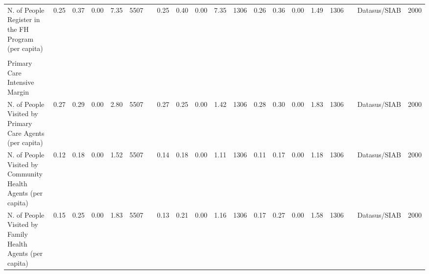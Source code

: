 \begin{sidewaystable}
\begin{table}[H]
\begin{footnotesize}
\begin{center}
{\begin{threeparttable}[b]
\begin{tabular}{rrrrrrrrrrrrrrrrrrrr}
    \multicolumn{1}{l}{N. of People Register in the FH Program (per capita)} & \multicolumn{1}{c}{0.25} & \multicolumn{1}{c}{0.37} & \multicolumn{1}{c}{0.00} & \multicolumn{1}{c}{7.35} & \multicolumn{1}{c}{5507} &       & \multicolumn{1}{c}{0.25} & \multicolumn{1}{c}{0.40} & \multicolumn{1}{c}{0.00} & \multicolumn{1}{c}{7.35} & \multicolumn{1}{c}{1306} & \multicolumn{1}{c}{0.26} & \multicolumn{1}{c}{0.36} & \multicolumn{1}{c}{0.00} & \multicolumn{1}{c}{1.49} & \multicolumn{1}{c}{1306} &       & \multicolumn{1}{c}{Datasus/SIAB} & \multicolumn{1}{c}{2000} \\
          &       &       &       &       &       &       &       &       &       &       &       &       &       &       &       &       &       &       &  \\
    \multicolumn{1}{l}{Primary Care Intensive Margin} &       &       &       &       &       &       &       &       &       &       &       &       &       &       &       &       &       &       &  \\
    \multicolumn{1}{l}{N. of People Visited by Primary Care Agents (per capita)} & \multicolumn{1}{c}{0.27} & \multicolumn{1}{c}{0.29} & \multicolumn{1}{c}{0.00} & \multicolumn{1}{c}{2.80} & \multicolumn{1}{c}{5507} &       & \multicolumn{1}{c}{0.27} & \multicolumn{1}{c}{0.25} & \multicolumn{1}{c}{0.00} & \multicolumn{1}{c}{1.42} & \multicolumn{1}{c}{1306} & \multicolumn{1}{c}{0.28} & \multicolumn{1}{c}{0.30} & \multicolumn{1}{c}{0.00} & \multicolumn{1}{c}{1.83} & \multicolumn{1}{c}{1306} &       & \multicolumn{1}{c}{Datasus/SIAB} & \multicolumn{1}{c}{2000} \\
    \multicolumn{1}{l}{N. of People Visited by Community Health Agents (per capita)} & \multicolumn{1}{c}{0.12} & \multicolumn{1}{c}{0.18} & \multicolumn{1}{c}{0.00} & \multicolumn{1}{c}{1.52} & \multicolumn{1}{c}{5507} &       & \multicolumn{1}{c}{0.14} & \multicolumn{1}{c}{0.18} & \multicolumn{1}{c}{0.00} & \multicolumn{1}{c}{1.11} & \multicolumn{1}{c}{1306} & \multicolumn{1}{c}{0.11} & \multicolumn{1}{c}{0.17} & \multicolumn{1}{c}{0.00} & \multicolumn{1}{c}{1.18} & \multicolumn{1}{c}{1306} &       & \multicolumn{1}{c}{Datasus/SIAB} & \multicolumn{1}{c}{2000} \\
    \multicolumn{1}{l}{N. of People Visited by Family Health Agents (per capita)} & \multicolumn{1}{c}{0.15} & \multicolumn{1}{c}{0.25} & \multicolumn{1}{c}{0.00} & \multicolumn{1}{c}{1.83} & \multicolumn{1}{c}{5507} &       & \multicolumn{1}{c}{0.13} & \multicolumn{1}{c}{0.21} & \multicolumn{1}{c}{0.00} & \multicolumn{1}{c}{1.16} & \multicolumn{1}{c}{1306} & \multicolumn{1}{c}{0.17} & \multicolumn{1}{c}{0.27} & \multicolumn{1}{c}{0.00} & \multicolumn{1}{c}{1.58} & \multicolumn{1}{c}{1306} &       & \multicolumn{1}{c}{Datasus/SIAB} & \multicolumn{1}{c}{2000} \\

\end{tabular}
\end{threeparttable}}
\end{center}
\end{footnotesize}
\end{table}
\end{sidewaystable}
